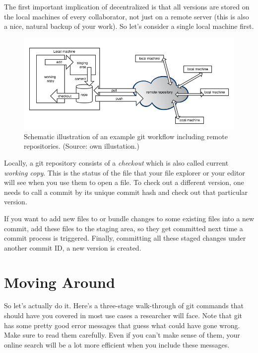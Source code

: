 \documentclass[
  12pt,
  letterpaper,
]{krantz}
\begin{document}
The first important implication of decentralized 
is that all versions are stored on the local machines of every
collaborator, not just on a remote server (this is also a nice, natural
backup of your work). So let's consider a single local machine first.

\begin{figure}

{\centering \includegraphics{./images/decentralized.png}

}

\caption{Schematic illustration of an example git workflow including
remote repositories. (Source: own illustation.)}

\end{figure}

Locally, a git repository consists of a \emph{checkout} which is also
called current \emph{working copy}. This is the status of the file that
your file explorer or your editor will see when you use them to open a
file. To check out a different version, one needs to call a commit by
its unique commit hash and check out that particular version.

If you want to add new files to  or bundle
changes to some existing files into a new commit, add these files to the
staging area, so they get committed next time a commit process is
triggered. Finally, committing all these staged changes under another
commit ID, a new version is created.

\hypertarget{moving-around}{%
\section{Moving Around}\label{moving-around}}

So let's actually do it. Here's a three-stage walk-through of git
commands that should have you covered in most use cases a researcher
will face. Note that git has some pretty good error messages that guess
what could have gone wrong. Make sure to read them carefully. Even if
you can't make sense of them, your online search will be a lot more
efficient when you include these messages.
\end{document}
